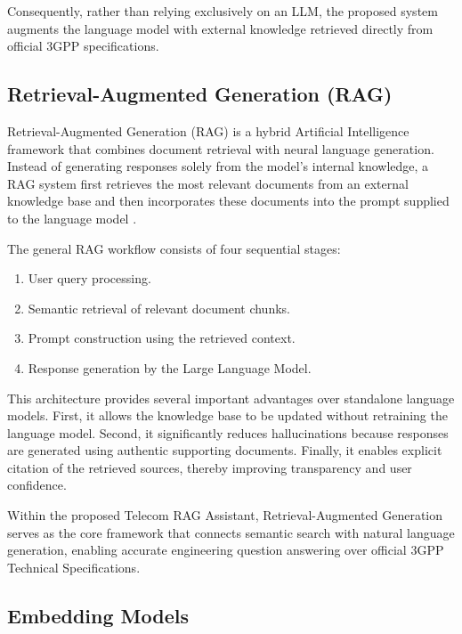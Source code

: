 Consequently, rather than relying exclusively on an LLM, the proposed system augments the language model with external knowledge retrieved directly from official 3GPP specifications.

\subsection{Retrieval-Augmented Generation (RAG)}

Retrieval-Augmented Generation (RAG) is a hybrid Artificial Intelligence framework that combines document retrieval with neural language generation. Instead of generating responses solely from the model's internal knowledge, a RAG system first retrieves the most relevant documents from an external knowledge base and then incorporates these documents into the prompt supplied to the language model \cite{jurafsky2023}.

The general RAG workflow consists of four sequential stages:

\begin{enumerate}
    \item User query processing.
    \item Semantic retrieval of relevant document chunks.
    \item Prompt construction using the retrieved context.
    \item Response generation by the Large Language Model.
\end{enumerate}

This architecture provides several important advantages over standalone language models. First, it allows the knowledge base to be updated without retraining the language model. Second, it significantly reduces hallucinations because responses are generated using authentic supporting documents. Finally, it enables explicit citation of the retrieved sources, thereby improving transparency and user confidence.

Within the proposed Telecom RAG Assistant, Retrieval-Augmented Generation serves as the core framework that connects semantic search with natural language generation, enabling accurate engineering question answering over official 3GPP Technical Specifications.

\subsection{Embedding Models}

